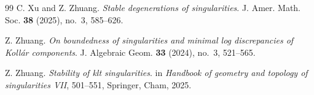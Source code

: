 \documentclass[11pt, leqno]{amsart}%
\theoremstyle{plain}
\theoremstyle{definition}
\theoremstyle{remark}
\numberwithin{equation}{section}
\begin{document}
\begin{thebibliography}{99}
     C. Xu and Z. Zhuang. \emph{Stable degenerations of singularities}.
    J. Amer. Math. Soc. \textbf{38} (2025), no.~3, 585--626.
	

     Z. Zhuang. \emph{On boundedness of singularities and minimal log discrepancies of Kollár components}. 
    J. Algebraic Geom. {\bf 33} (2024), no.~3, 521--565.

    
     Z. Zhuang. \emph{Stability of klt singularities}. in {\it Handbook of geometry and topology of singularities VII}, 501--551, Springer, Cham, 2025.



	
    
	
	
	
\end{thebibliography}
\end{document}
